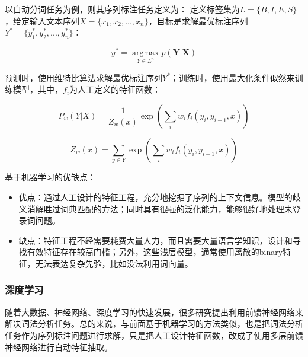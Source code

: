 以自动分词任务为例，则其序列标注任务定义为：
定义标签集为$L=\{B, I, E, S\}$，给定输入文本序列$X=\{x_{1}, x_{2}, ..., x_{n}\}$，目标是求解最优标注序列$Y^{*}=\{y^{*}_{1}, y^{*}_{2}, ..., y^{*}_{n}\}$：

\[y^{*}=\mathop{\arg\max}\limits_{Y \in L^{n}} p(\bm{Y}|\bm{X})\]

预测时，使用维特比算法求解最优标注序列$Y^{*}$；训练时，使用最大化条件似然来训练模型，其中，$f_{i}$为人工定义的特征函数：

\[P_{w}(Y|X)=\frac{1}{Z_{w}(x)}\exp(\sum_{i} w_{i} f_{i}(y_{i}, y_{i-1}, x))\]

\[Z_{w}(x)=\sum\limits_{y \in Y}\exp(\sum_{i} w_{i} f_{i}(y_{i}, y_{i-1}, x))\]

\noindent
基于机器学习的优缺点：
\begin{itemize}
\item 优点：通过人工设计的特征工程，充分地挖掘了序列的上下文信息。模型的歧义消解胜过词典匹配的方法；同时具有很强的泛化能力，能够很好地处理未登录词问题。
\item 缺点：特征工程不经需要耗费大量人力，而且需要大量语言学知识，设计和寻找有效特征存在较高门槛；另外，这些浅层模型，通常使用离散的binary特征，无法表达复杂先验，比如没法利用词向量。
\end{itemize}

\subsubsection{深度学习}
随着大数据、神经网络、深度学习的快速发展，很多研究提出利用前馈神经网络来解决词法分析\cite{collobert2011natural}\cite{zheng2013deep}任务。总的来说，与前面基于机器学习的方法类似，也是把词法分析任务作为序列标注问题进行求解，只是把人工设计特征函数，改成了使用多层前馈神经网络进行自动特征抽取。

